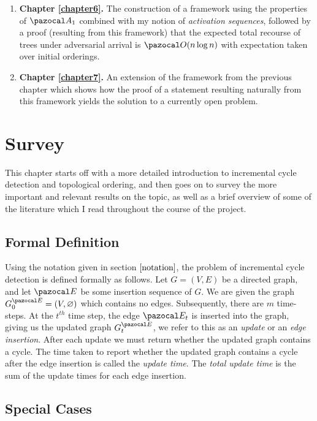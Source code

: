 \documentclass{report}
\begin{document}
\begin{enumerate}[-]
    \item \textbf{Chapter \ref{chapter6}.} The construction of a framework using the properties of $\pazocal A_1$ combined with my notion of \textit{activation sequences}, followed by a proof (resulting from this framework) that the expected total recourse of trees under adversarial arrival is $\pazocal O(n \log n)$ with expectation taken over initial orderings.
    
    \item \textbf{Chapter \ref{chapter7}.} An extension of the framework from the previous chapter which shows how the proof of a statement resulting naturally from this framework yields the solution to a currently open problem.
\end{enumerate}

\chapter{Survey}\label{chapter2}

This chapter starts off with a more detailed introduction to incremental cycle detection and topological ordering, and then goes on to survey the more important and relevant results on the topic, as well as a brief overview of some of the literature which I read throughout the course of the project.

\section{Formal Definition}

Using the notation given in section $\ref{notation}$, the problem of incremental cycle detection is defined formally as follows. Let $G=(V,E)$ be a directed graph, and let $\pazocal E$ be some insertion sequence of $G$. We are given the graph $G^{\pazocal E}_{0} = (V, \varnothing)$ which contains no edges. Subsequently, there are $m$ time-steps. At the $t^{th}$ time step, the edge $\pazocal E_t$ is inserted into the graph, giving us the updated graph $G^{\pazocal E}_t$, we refer to this as an \textit{update} or an \textit{edge insertion}. After each update we must return whether the updated graph contains a cycle. The time taken to report whether the updated graph contains a cycle after the edge insertion is called the \textit{update time}. The \textit{total update time} is the sum of the update times for each edge insertion. 

\section{Special Cases}
\end{document}
